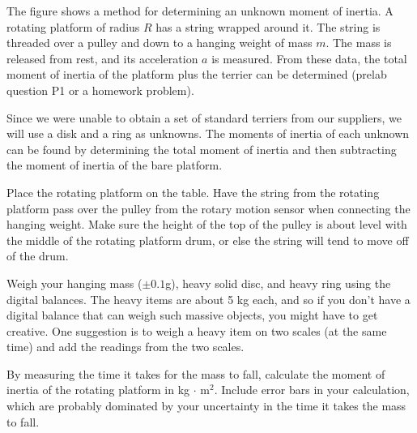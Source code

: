 \label{lab:moment-of-inertia-brian}

\apparatus
{}


\introduction

The figure shows a method for determining an unknown moment of inertia.
A rotating platform of radius $R$ has
a string wrapped around it. The string is threaded over a pulley and
down to a hanging weight of mass $m$. The mass is released from rest,
and its acceleration $a$ is measured. From these data, the total moment
of inertia of the platform plus the terrier can be determined (prelab question
P1 or a homework problem).


Since we were unable to obtain a set of standard terriers from our
suppliers, we will use a disk and a ring as unknowns. The moments of
inertia of each unknown can be found by determining the total moment
of inertia and then subtracting the moment of inertia of the bare platform.


\setup

Place the rotating platform on the table. Have the string from the
rotating platform pass over the pulley from the rotary motion sensor
when connecting the hanging weight. Make sure the height of the top of
the pulley is about level with the middle of the rotating platform
drum, or else the string will tend to move off of the drum. 

Weigh your hanging mass ($\pm0.1$g), heavy solid disc, and heavy ring
using the digital balances. The heavy items are about 5 kg each, and
so if you don't have a digital balance that can weigh such massive
objects, you might have to get creative. One suggestion is to weigh a
heavy item on two scales (at the same time) and add the readings from
the two scales. 

\observations


By measuring the time it takes for the mass to fall, calculate the
moment of inertia of the rotating platform in kg$\,\cdot\,$m$^2$.
Include error bars in your calculation, which are probably dominated
by your uncertainty in the time it takes the mass to fall. 

